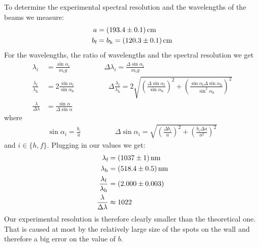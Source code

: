 \documentclass{protokoll_en}
\begin{document}
To determine the experimental spectral resolution and the wavelengths of the beams we measure:
\begin{align}
a &= \unit[(193.4 \pm 0.1)]{cm}\\
\notag b_\textrm{f} &= b_\textrm{h} = \unit[(120.3 \pm 0.1)]{cm}%
\end{align}
For the wavelengths, the ratio of wavelengths and the spectral resolution we get
\begin{align*}
\lambda_i &= \frac{\sin\alpha_i}{m_ig}\hspace{2cm}\Delta \lambda_i = \frac{\Delta\sin\alpha_i}{m_ig}\\
\frac{\lambda_\textrm{f}}{\lambda_\textrm{h}} &= 2 \frac{\sin\alpha_\textrm{f}}{\sin\alpha_\textrm{h}}\hspace{2cm} \Delta\frac{\lambda_\textrm{f}}{\lambda_\textrm{h}} = 2\sqrt{\left(\frac{\Delta\sin\alpha_\textrm{f}}{\sin\alpha_\textrm{h}}\right)^2+\left(\frac{\sin\alpha_\textrm{f}\Delta\sin\alpha_\textrm{h}}{\sin^2\alpha_\textrm{h}}\right)^2}\\
\frac{\lambda}{\Delta \lambda}&=\frac{\sin\alpha}{\Delta\sin\alpha}
\end{align*}
where
\begin{align*}
\sin\alpha_i = \frac{b_i}{a}\hspace{2cm}\Delta \sin\alpha_i=\sqrt{\left(\frac{\Delta b_i}{a}\right)^2+\left(\frac{b_i\Delta a}{a^2}\right)^2}
\end{align*}
and $i \in \{h,f\}$. Plugging in our values we get:
\begin{align}
\lambda_\textrm{f}&=\unit[(1037 \pm 1)]{nm} \\
 \lambda_\textrm{h}&=\unit[(518.4 \pm 0.5)]{nm}\\
\frac{\lambda_\textrm{f}}{\lambda_\textrm{h}} &= \unit[(2.000 \pm 0.003)]{}\\
\frac{\lambda}{\Delta \lambda} &\approx \unit[1022]{}
\end{align}
Our experimental resolution is therefore clearly smaller than the theoretical one. That is caused at most by the relatively large size of the spots on the wall and therefore a big error on the value of $b$.
\end{document}

